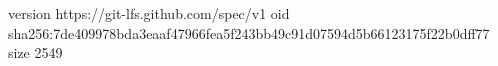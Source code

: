 version https://git-lfs.github.com/spec/v1
oid sha256:7de409978bda3eaaf47966fea5f243bb49c91d07594d5b66123175f22b0dff77
size 2549
